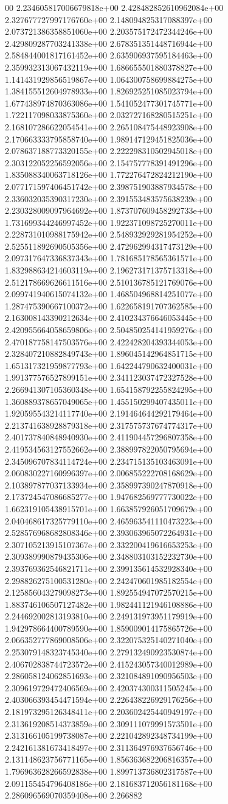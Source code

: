 00	2.234605817006679818e+00	2.428482852610962084e+00	2.327677727997176760e+00	2.148094825317088397e+00	2.073721386358851060e+00	2.203575172472344246e+00	2.429809287703241338e+00	2.678351351448716944e+00	2.584844001817161452e+00	2.635906937595184463e+00	2.359932313067432119e+00	1.686655501880378827e+00	1.141431929856519867e+00	1.064300758699884275e+00	1.384155512604978933e+00	1.826925251085023794e+00	1.677438974870363086e+00	1.541052477301745771e+00	1.722117098033875360e+00	2.032727168280515251e+00	2.168107286622054541e+00	2.265108475448923908e+00	2.170663333795858740e+00	1.989147129451825036e+00	2.078637188773320155e+00	2.222298310502945018e+00	2.303122052256592056e+00	2.154757778391491296e+00	1.835088340063718126e+00	1.772276472824212190e+00	2.077171597406451742e+00	2.398751903887934578e+00	2.336032035390317230e+00	2.391553483575638239e+00	2.230328009097964692e+00	1.873707609458292733e+00	1.731699344246997452e+00	1.922371098725270011e+00	2.228731010988175942e+00	2.548932929281954252e+00	2.525511892690505356e+00	2.472962994317473129e+00	2.097317647336837343e+00	1.781685178565361571e+00	1.832988634214603119e+00	2.196273171375713318e+00	2.512178669626611516e+00	2.510136785121769076e+00	2.099741940615074132e+00	1.468504968814251077e+00	1.287475390667100372e+00	1.622658191707362585e+00	2.163008143390212634e+00	2.410234376646053445e+00	2.420955664058659806e+00	2.504850254141959276e+00	2.470187758147503576e+00	2.422428204393344053e+00	2.328407210882849743e+00	1.896045142964851715e+00	1.651317321959877793e+00	1.642244790632400031e+00	1.991377576527899151e+00	2.341123037472327528e+00	2.266941307105360348e+00	1.654158792255824295e+00	1.360889378657049065e+00	1.455150299407435011e+00	1.920595543214117740e+00	2.191464644292179464e+00	2.213741638928879318e+00	2.317575737674774317e+00	2.401737840848940930e+00	2.411904457296807358e+00	2.419534563127552662e+00	2.388997822050795694e+00	2.345096707834114724e+00	2.234715135103463091e+00	2.060830227160996397e+00	2.006855222708168629e+00	2.103897877037133934e+00	2.358997390247870918e+00	2.173724547086685277e+00	1.947682569777730022e+00	1.662319105438915701e+00	1.663857926051709679e+00	2.040468617325779110e+00	2.465963541110473223e+00	2.528576968682808346e+00	2.393063965072264931e+00	2.307105213915107367e+00	2.332200419616653253e+00	2.309389990879435306e+00	2.348803103152232730e+00	2.393769362546821711e+00	2.399135614532928340e+00	2.298826275100531280e+00	2.242470601985182554e+00	2.125856043279098273e+00	1.892554947072570215e+00	1.883746106507127482e+00	1.982441121946108886e+00	2.244692002813193810e+00	2.249131973951179919e+00	1.942978664400789590e+00	1.859009014175865726e+00	2.066352777869008506e+00	2.322075325140271040e+00	2.253079148323745340e+00	2.279132490923530874e+00	2.406702838744723572e+00	2.415243057340012989e+00	2.286058124062851693e+00	2.321084891090956503e+00	2.309619729472406569e+00	2.420374300311505245e+00	2.403066393454471594e+00	2.226438226929176256e+00	2.181973295126348411e+00	2.203602425440949197e+00	2.313619208514373859e+00	2.309111079991573501e+00	2.313166105199738087e+00	2.221042892348734199e+00	2.242161381673418497e+00	2.311364976937656746e+00	2.131148623756771165e+00	1.856363682206816357e+00	1.796963628266592838e+00	1.899713736802317587e+00	2.091155454796408186e+00	2.181683712056181168e+00	2.286096569070359408e+00	2.266882
